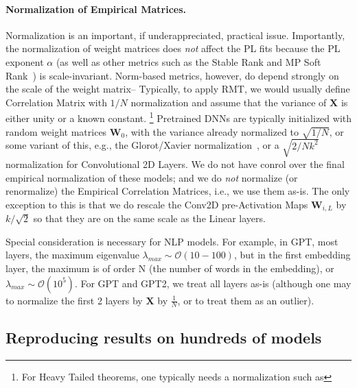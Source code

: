 \paragraph{Normalization of Empirical Matrices.}  
Normalization is an important, if underappreciated, practical issue.
Importantly, the normalization of weight matrices does \emph{not} affect the PL fits because the PL exponent $\alpha$ (as well as other metrics such as the Stable Rank and MP Soft Rank~\cite{MM18_TR,MM19_HTSR_ICML}) is scale-invariant.
Norm-based metrics, however, do depend strongly on the scale of the weight matrix--
Typically, to apply RMT, we would usually define Correlation Matrix with $1/N$ normalization and assume that the variance of $\mathbf{X}$ is either unity or a known constant.%
\footnote{For Heavy Tailed theorems, one typically needs a normalization such as }
Pretrained DNNs are typically initialized with random weight matrices $\mathbf{W}_{0}$, with the variance already normalized to $\sqrt{1/N}$, or some variant of this, e.g., the Glorot/Xavier normalization~\cite{GloRot}, or a $\sqrt{2/Nk^2}$ normalization for Convolutional 2D Layers.
We do not have conrol over the final empirical normalization of these models; and we do \emph{not} normalize (or renormalize) the Empirical Correlation Matrices, i.e., we use them as-is.
The only exception to this is that we do rescale the Conv2D pre-Activation Maps $\mathbf{W}_{i,L}$ by $k/\sqrt{2}$ so that they are on the same scale as the Linear layers.

Special consideration is necessary for NLP models.
For example, in GPT, most layers, the maximum eigenvalue $\lambda_{max}\sim\mathcal{O}(10-100)$,
but in the first embedding layer, the maximum is of order N (the number of words in the embedding), or
 $\lambda_{max}\sim\mathcal{O}(10^{5})$.  For GPT and GPT2, we treat all layers as-is (although one may to normalize
the first 2 layers by  $\mathbf{X}$ by $\frac{1}{N}$, or to treat them as an outlier).

\subsection{Reproducing results on hundreds of models}






